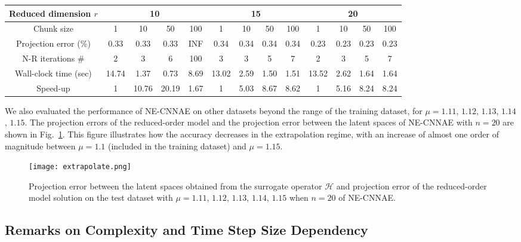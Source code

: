 \begin{table}[!ht]
\begin{center}
\begin{tabular}{|c|c|c|c|c|c|c|c|c|c|c|c|c|}
    Reduced dimension $r$ & \multicolumn{4}{|c|}{10} & \multicolumn{4}{|c|}{15} & \multicolumn{4}{|c|}{20}\\ \hline
    Chunk size & 1 & 10 & 50 & 100 & 1 & 10 & 50 & 100 & 1 & 10 & 50 & 100 \\ \hline
    Projection error (\%) & 0.33 & 0.33 & 0.33 & INF & 0.34 & 0.34 & 0.34 & 0.34 & 0.23 & 0.23 & 0.23 & 0.23 \\ \hline
    N-R iterations $\#$ & 2 & 3 & 6 & 100 & 3 & 3 & 5 & 7 & 2 & 3 & 5 & 7 \\ \hline 
    Wall-clock time (sec) & 14.74 & 1.37 & 0.73 & 8.69 & 13.02 & 2.59 & 1.50 & 1.51 & 13.52 & 2.62 & 1.64 & 1.64 \\ \hline 
    Speed-up & 1 & 10.76 & 20.19 & 1.67 & 1 & 5.03 & 8.67 & 8.62 & 1 & 5.16 & 8.24 & 8.24 \\ \hline
    \end{tabular}
    \end{center}
 \end{table}

We also evaluated the performance of NE-CNNAE on other datasets beyond the range of the training dataset, for $\mu = 1.11$, $1.12$, $1.13$, $1.14$, $1.15$. The projection errors of the reduced-order model and the projection error between the latent spaces of NE-CNNAE with $n = 20$ are shown in Fig.~\ref{fig: extrapolate}. This figure illustrates how the accuracy decreases in the extrapolation regime, with an increase of almost one order of magnitude between $\mu = 1.1$ (included in the training dataset) and $\mu = 1.15$.

\begin{figure}[!htb]
     \begin{center}
        \texttt{[image: extrapolate.png]}
     \end{center}
     \caption[Projection error on extrapolated dataset.]{Projection error between the latent spaces obtained from the surrogate operator $\mathcal{H}$ and projection error of the reduced-order model solution on the test dataset with $\mu = 1.11$, $1.12$, $1.13$, $1.14$, $1.15$ when $n = 20$ of NE-CNNAE.}
        \label{fig: extrapolate}
\end{figure}


\subsection{Remarks on Complexity and Time Step Size Dependency}\label{subsec:time-dependency}

